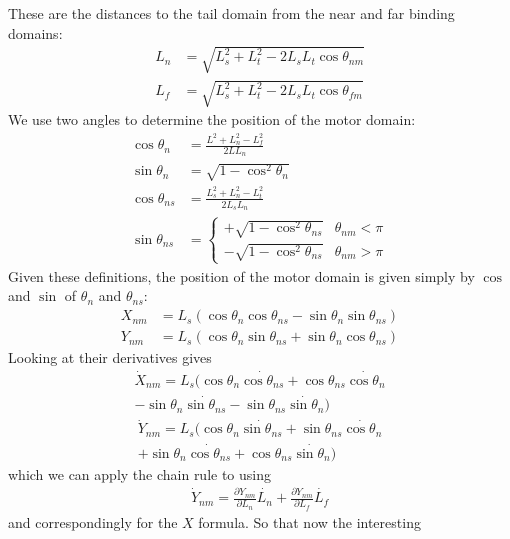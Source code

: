 \documentclass[11pt,twocolumn]{article}
\begin{document}
These are the distances to the tail domain from the near and far
binding domains:
\begin{align}
  L_n &= \sqrt{L_s^2 + L_t^2 - 2L_sL_t\cos{\theta_{nm}}} \\
  L_f &= \sqrt{L_s^2 + L_t^2 - 2L_sL_t\cos{\theta_{fm}}}
\end{align}
We use two angles to determine the position of the motor domain:
\begin{align}
  \cos\theta_n &= \frac{L^2 + L_n^2 - L_f^2}{2L L_n} \\
  \sin\theta_{n} &= \sqrt{1 - \cos^2\theta_{n}} \\
  \cos\theta_{ns} &= \frac{L_s^2 + L_n^2 - L_t^2}{2L_s L_n} \\
  \sin\theta_{ns} &=
  \begin{cases}
    +\sqrt{1 - \cos^2\theta_{ns}} & \theta_{nm} < \pi \\
    -\sqrt{1 - \cos^2\theta_{ns}} & \theta_{nm} > \pi
  \end{cases}
\end{align}
Given these definitions, the position of the motor domain is given
simply by $\cos$ and $\sin$ of $\theta_n$ and $\theta_{ns}$:
\begin{align}
  X_{nm} &= L_s\left(
  \cos\theta_n\cos\theta_{ns} - \sin\theta_n\sin\theta_{ns}
  \right)
  \\
  Y_{nm} &= L_s\left(
  \cos\theta_n\sin\theta_{ns} + \sin\theta_n\cos\theta_{ns}
  \right)
\end{align}
Looking at their derivatives gives
\begin{multline}
  \dot{X}_{nm} = L_s\Big(
  \cos\theta_n\dot{\cos\theta_{ns}} + \cos\theta_{ns}\dot{\cos\theta_{n}} \\
  - \sin\theta_n\dot{\sin\theta_{ns}} - \sin\theta_{ns}\dot{\sin\theta_{n}}
  \Big)
\end{multline}
\begin{multline}
  \dot{Y}_{nm} = L_s\Big(
  \cos\theta_n\dot{\sin\theta_{ns}} + \sin\theta_{ns}\dot{\cos\theta_{n}} \\
  + \sin\theta_n\dot{\cos\theta_{ns}} + \cos\theta_{ns}\dot{\sin\theta_{n}}
  \Big)
\end{multline}
which we can apply the chain rule to using
\begin{align}
  \dot{Y}_{nm} = \frac{\partial Y_{nm}}{\partial L_n} \dot{L_n}
  +  \frac{\partial Y_{nm}}{\partial L_{f}} \dot{L_{f}}
\end{align}
and correspondingly for the $X$ formula.  So that now the interesting
\end{document}
